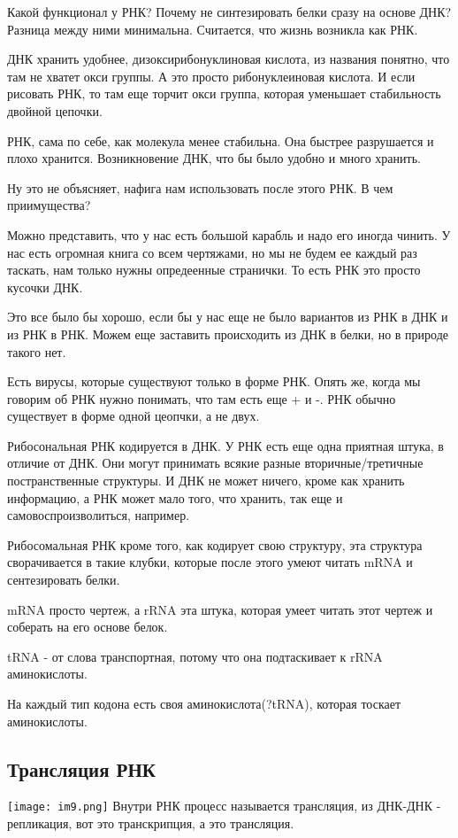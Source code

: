 Какой функционал у РНК? Почему не синтезировать 
белки сразу на основе ДНК? Разница между ними минимальна. 
Считается, что жизнь возникла как РНК. 

ДНК хранить удобнее, дизоксирибонуклиновая кислота, из 
названия понятно, что там не хватет окси группы. А это 
просто рибонуклеиновая кислота. И если рисовать РНК, то 
там еще торчит окси группа, которая уменьшает стабильность 
двойной цепочки. 

РНК, сама по себе, как молекула менее стабильна. Она быстрее 
разрушается и плохо хранится. Возникновение ДНК, что бы 
было удобно и много хранить. 

Ну это не объясняет, нафига нам использовать после этого РНК. В чем 
приимущества? 

Можно представить, что у нас есть большой карабль и надо его 
иногда чинить. У нас есть огромная книга со всем чертяжами, 
но мы не будем ее каждый раз таскать, нам только нужны опредеенные странички. 
То есть РНК это просто кусочки ДНК. 

Это все было бы хорошо, если бы у нас 
еще не было вариантов из РНК в ДНК и из РНК в РНК. Можем
еще заставить происходить из ДНК в белки, но в природе такого нет.

Есть вирусы, которые существуют только в форме РНК. Опять же,
когда мы говорим об РНК нужно понимать, что там есть еще + и -. РНК
обычно существует в форме одной цеопчки, а не двух.

Рибосональная РНК кодируется в ДНК. У РНК есть
еще одна приятная штука, в отличие от ДНК. Они могут
принимать всякие разные вторичные/третичные постранственные структуры.
И ДНК не может ничего, кроме как хранить информацию, а РНК может
мало того, что хранить, так еще и самовоспроизволиться, например.

Рибосомальная РНК кроме того, как кодирует свою структуру, эта структура 
сворачивается в такие клубки, которые после этого умеют 
читать mRNA и сентезировать белки.

mRNA просто чертеж, а rRNA эта штука, которая умеет читать этот чертеж и соберать
на его основе белок.

tRNA - от слова транспортная, потому что она подтаскивает к rRNA аминокислоты.

На каждый тип кодона есть своя аминокислота(?tRNA), которая тоскает аминокислоты. 

\subsection{Трансляция РНК}
\texttt{[image: im9.png]}
Внутри РНК процесс называется трансляция, из ДНК-ДНК - репликация, 
вот это транскрипция, а это трансляция.

